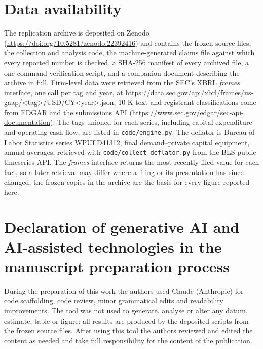 \documentclass[preprint,11pt]{elsarticle}
\begin{document}
\section*{Data availability}
The replication archive is deposited on Zenodo (\url{https://doi.org/10.5281/zenodo.22392416}) and contains the frozen source
files, the collection and analysis code, the machine-generated claims file against which every
reported number is checked, a SHA-256 manifest of every archived file, a one-command verification
script, and a companion document describing the archive in full.
Firm-level data were retrieved from the SEC's XBRL \emph{frames}
interface, one call per tag and year, at
\url{https://data.sec.gov/api/xbrl/frames/us-gaap/<tag>/USD/CY<year>.json}; 10-K text and
registrant classifications come from EDGAR and the submissions API
(\url{https://www.sec.gov/edgar/sec-api-documentation}). The tags unioned for each series,
including capital expenditure and operating cash flow, are listed in \texttt{code/engine.py}.
The deflator is Bureau of Labor Statistics series WPUFD41312, final demand--private capital
equipment, annual averages, retrieved with \texttt{code/collect\_deflator.py} from the BLS public
timeseries API. The \emph{frames} interface returns the
most recently filed value for each fact, so a later retrieval may differ where a filing or its
presentation has since changed; the frozen copies in the archive are the basis for every figure reported here.

\section*{Declaration of generative AI and AI-assisted technologies in the manuscript preparation process}
During the preparation of this work the authors used Claude (Anthropic) for code scaffolding, code
review, minor grammatical edits and readability improvements. The tool was not used to generate,
analyse or alter any datum, estimate, table or figure: all results are produced by the deposited
scripts from the frozen source files. After using this tool the authors reviewed and edited the
content as needed and take full responsibility for the content of the publication.
\end{document}
